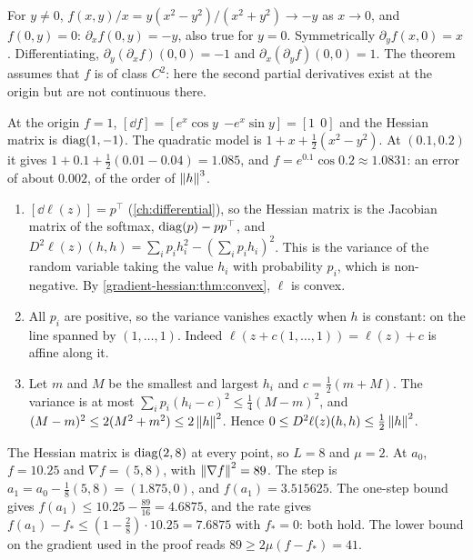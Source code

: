For $y\neq0$, $f(x, y)/x = y(x^2 - y^2)/(x^2 + y^2)\to-y$ as $x\to0$,
and $f(0, y) = 0$: $\partial_xf(0, y) = -y$, also true for $y = 0$.
Symmetrically $\partial_yf(x, 0) = x$. Differentiating,
$\partial_y(\partial_xf)(0, 0) = -1$ and
$\partial_x(\partial_yf)(0, 0) = 1$. The theorem assumes that $f$ is of
class $C^2$: here the second partial derivatives exist at the origin but
are not continuous there.

At the origin $f = 1$, $[\dd f] = [e^x\cos y\ \ {-e^x\sin y}] = [1\ \ 0]$
and the Hessian matrix is $\operatorname{diag}(1, -1)$. The quadratic model is
$1 + x + \frac12(x^2 - y^2)$. At $(0.1, 0.2)$ it gives
$1 + 0.1 + \frac12(0.01 - 0.04) = 1.085$, and
$f = e^{0.1}\cos0.2\approx1.0831$: an error of about $0.002$, of the
order of $\left\|h\right\|^3$.

\begin{enumerate}[nosep]
  \item $[\dd\ell(z)] = p^\top$ (\cref{ch:differential}), so the Hessian
        matrix is the Jacobian matrix of the softmax,
        $\operatorname{diag}(p) - pp^\top$, and
        $D^2\ell(z)(h, h) = \sum_ip_ih_i^2 - (\sum_ip_ih_i)^2$. This is
        the variance of the random variable taking the value $h_i$ with
        probability $p_i$, which is non-negative. By
        \cref{gradient-hessian:thm:convex}, $\ell$ is convex.
  \item All $p_i$ are positive, so the variance vanishes exactly when
        $h$ is constant: on the line spanned by $(1,\dots,1)$. Indeed
        $\ell(z + c(1,\dots,1)) = \ell(z) + c$ is affine along it.
  \item Let $m$ and $M$ be the smallest and largest $h_i$ and
        $c = \frac12(m + M)$. The variance is at most
        $\sum_ip_i(h_i - c)^2\leq\frac14(M - m)^2$, and
        $(M - m)^2\leq2(M^2 + m^2)\leq2\left\|h\right\|^2$. Hence
        $0\leq D^2\ell(z)(h, h)\leq\frac12\left\|h\right\|^2$.
\end{enumerate}

The Hessian matrix is $\operatorname{diag}(2, 8)$ at every point, so $L = 8$ and
$\mu = 2$. At $a_0$, $f = 10.25$ and $\nabla f = (5, 8)$, with
$\left\|\nabla f\right\|^2 = 89$. The step is
$a_1 = a_0 - \frac18(5, 8) = (1.875, 0)$, and $f(a_1) = 3.515625$. The
one-step bound gives
$f(a_1)\leq10.25 - \frac{89}{16} = 4.6875$, and the rate gives
$f(a_1) - f_*\leq(1 - \frac28)\cdot10.25 = 7.6875$ with $f_* = 0$: both
hold. The lower bound on the gradient used in the proof reads
$89\geq2\mu(f - f_*) = 41$.

